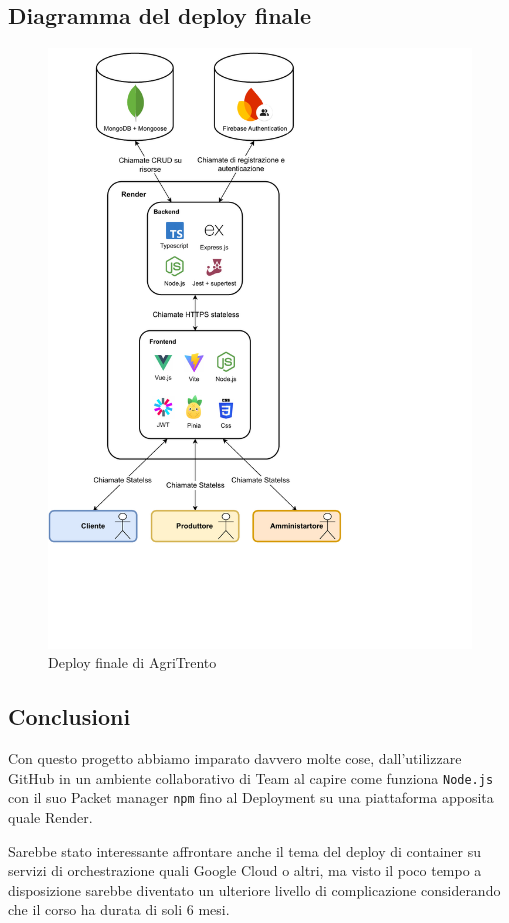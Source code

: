 \subsection{Diagramma del deploy finale}

\begin{figure}[h!]
    \centering
    \includegraphics[trim= 0cm 5cm 6.5cm 0cm, clip, width=0.8\linewidth]{Deliverables/fourth-deliverable/img/DiagrammaAgriTrento.drawio.pdf}
    \caption{Deploy finale di AgriTrento}
\end{figure}

\newpage
\subsection{Conclusioni}

Con questo progetto abbiamo imparato davvero molte cose, dall'utilizzare GitHub in un ambiente collaborativo di Team al capire come funziona \verb|Node.js| con il suo Packet manager \verb|npm| fino al Deployment su una piattaforma apposita quale Render.


Sarebbe stato interessante affrontare anche il tema del deploy di container su servizi di orchestrazione quali Google Cloud o altri, ma visto il poco tempo a disposizione sarebbe diventato un ulteriore livello di complicazione considerando che il corso ha durata di soli 6 mesi.


